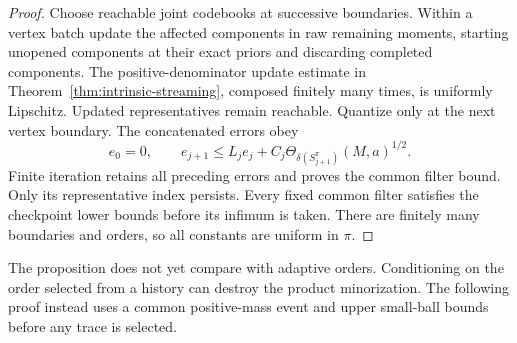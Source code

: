 \begin{proof}
Choose reachable joint codebooks at successive boundaries. Within a
vertex batch update the affected components in raw remaining moments,
starting unopened components at their exact priors and discarding
completed components. The positive-denominator update estimate in
Theorem~\ref{thm:intrinsic-streaming}, composed finitely many times,
is uniformly Lipschitz. Updated representatives remain reachable.
Quantize only at the next vertex boundary. The concatenated errors obey
\[
 e_0=0,\qquad e_{j+1}\le L_j e_j+
                 C_j\Theta_{\delta(S_{j+1}^\pi)}(M,a)^{1/2}.
\]
Finite iteration retains all preceding errors and proves the common
filter bound. Only its representative index persists. Every fixed
common filter satisfies the checkpoint lower bounds before its
infimum is taken. There are finitely many boundaries and orders, so
all constants are uniform in $\pi$.
\end{proof}

The proposition does not yet compare with adaptive orders. Conditioning
on the order selected from a history can destroy the product
minorization. The following proof instead uses a common positive-mass
event and upper small-ball bounds before any trace is selected.
